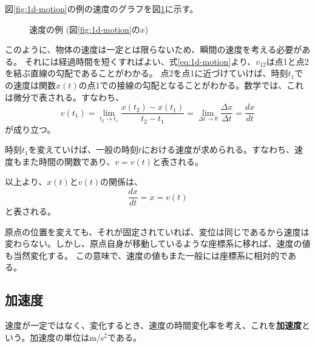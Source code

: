 \documentclass[a4paper, uplatex]{jsarticle}
\begin{document}
図\ref{fig:1d-motion}の例の速度のグラフを図\ref{fig:1d-velocity}に示す。

\begin{figure}[htbp]
\centering
{}
\caption{速度の例 (図\ref{fig:1d-motion}の\(x\))}\label{fig:1d-velocity}
\end{figure}

このように、物体の速度は一定とは限らないため、瞬間の速度を考える必要がある。
それには経過時間を短くすればよい、式\ref{eq:1d-motion}より、\(v_{12}\)は点1と点2を結ぶ直線の勾配であることがわかる。
点2を点1に近づけていけば、時刻\(t_1\)での速度は関数\(x(t)\)の点1での接線の勾配となることがわかる。数学では、これは微分で表される。すなわち、
\begin{equation}
  v(t_1) = \lim_{t_2 \to t_1} \frac{x(t_2) - x(t_1)}{t_2 - t_1} = \lim_{\Delta t \to 0} \frac{\Delta x}{\Delta t} = \frac{dx}{dt}
  \label{eq:1d-velocity}
\end{equation}
が成り立つ。

時刻\(t_1\)を変えていけば、一般の時刻\(t\)における速度が求められる。すなわち、速度もまた時間の関数であり、\(v = v(t)\)と表される。

以上より、\(x(t)\)と\(v(t)\)の関係は、
\begin{equation}
  \frac{dx}{dt} = \dot{x} = v(t)
  \label{eq:1d-v-x}
\end{equation}
と表される。

原点の位置を変えても、それが固定されていれば、変位は同じであるから速度は変わらない。しかし、原点自身が移動しているような座標系に移れば、速度の値も当然変化する。
この意味で、速度の値もまた一般には座標系に相対的である。

\subsection{加速度}

速度が一定ではなく、変化するとき、速度の時間変化率を考え、これを\textbf{加速度}という。加速度の単位はm/s\(^2\)である。
\end{document}
